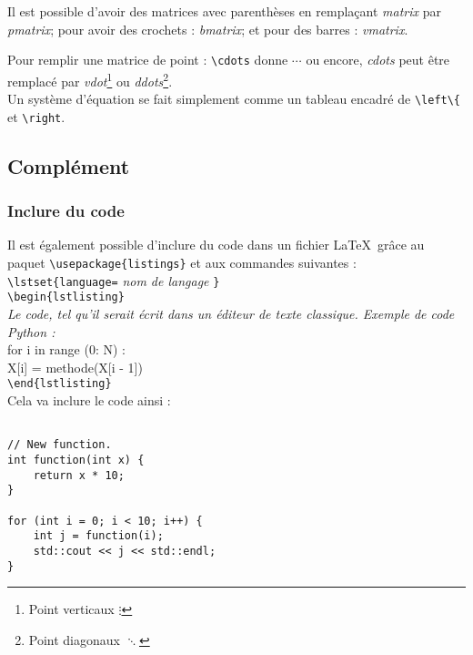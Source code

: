 \documentclass[11pt]{article}				%
\begin{document}
\noindent Il est possible d'avoir des matrices avec parenthèses en remplaçant \emph{matrix} par \emph{pmatrix}; pour avoir des crochets : \emph{bmatrix}; et pour des barres : \emph{vmatrix}.

\noindent Pour remplir une matrice de point : \verb?\cdots? donne $\cdots$ ou encore, \emph{cdots} peut être remplacé par \emph{vdot}\footnote{Point verticaux $\vdots$} ou \emph{ddots}\footnote{Point diagonaux $\ddots$}. \\


\noindent Un système d'équation se fait simplement comme un tableau encadré de \verb?\left\{? et \verb?\right?.


\newpage



\subsection{Complément}


\subsubsection{Inclure du code}


\noindent Il est également possible d'inclure du code dans un fichier \LaTeX \ grâce au paquet \verb?\usepackage{listings}? et aux commandes suivantes : \\

\noindent \verb?\lstset{language=? \emph{nom de langage} \verb?}? \\
\verb?\begin{lstlisting}? \\
\emph{Le code, tel qu'il serait écrit dans un éditeur de texte classique. Exemple de code Python :} \\
for i in range (0: N) : \\
\indent X[i] = methode(X[i - 1]) \\
\verb?\end{lstlisting}? \\

\noindent Cela va inclure le code ainsi :

\lstset{language=c++}
\begin{lstlisting}

// New function.
int function(int x) {
    return x * 10;
}

for (int i = 0; i < 10; i++) {
	int j = function(i);
	std::cout << j << std::endl;
}

\end{lstlisting}
\end{document}
